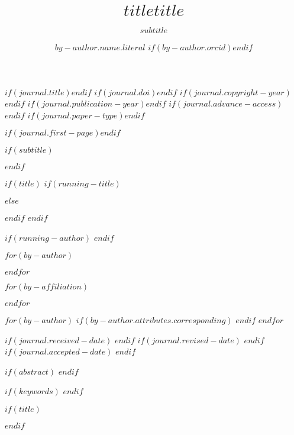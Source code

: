
$if(journal.title)$$endif$
$if(journal.doi)$$endif$
$if(journal.copyright-year)$$endif$
$if(journal.publication-year)$$endif$
$if(journal.advance-access)$$endif$
$if(journal.paper-type)$$endif$

$if(journal.first-page)$$endif$

$if(subtitle)$\subtitle{$subtitle$}$endif$

$if(title)$
$if(running-title)$
\title[$running-title$]{$title$}
$else$
\title[$title$]{$title$}
$endif$
$endif$

$if(running-author)$
$endif$

$for(by-author)$
\author[$if(by-author.affiliations)$$for(by-author.affiliations)$$it.id$$sep$,$endfor$$endif$%
$if(by-author.attributes.corresponding)$,%
$$\ast$$%
$endif$%
]{$by-author.name.literal$ $if(by-author.orcid)$$endif$}
$endfor$

$for(by-affiliation)$
\address[$it.id$]{$_affiliation.tex()$}
$endfor$

$for(by-author)$
$if(by-author.attributes.corresponding)$
$endif$
$endfor$

$if(journal.received-date)$
$endif$
$if(journal.revised-date)$
$endif$
$if(journal.accepted-date)$
$endif$

$if(abstract)$
$endif$

$if(keywords)$
$endif$

$if(title)$
\maketitle
$endif$


